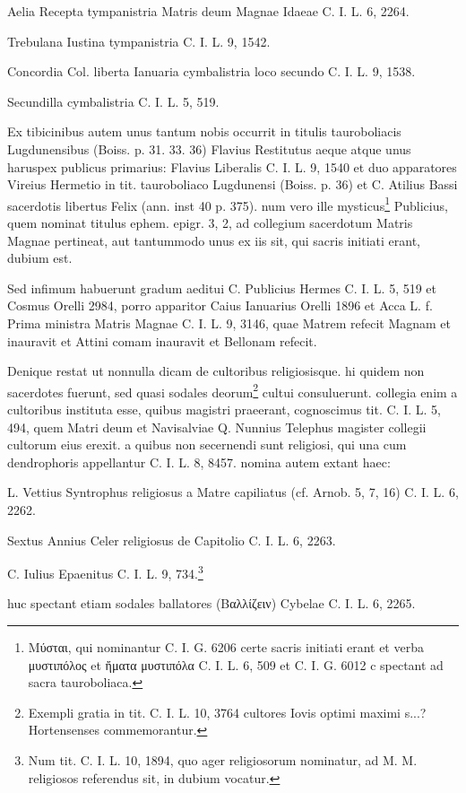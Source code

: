 \documentclass[a4paper, 11pt, oneside, polutonikogreek, german, twocolumn]{article}
\begin{document}
Aelia Recepta tympanistria Matris deum Magnae Idaeae C. I. L. 6, 2264.

Trebulana Iustina tympanistria C. I. L. 9, 1542.

Concordia Col. liberta Ianuaria cymbalistria loco secundo C. I. L. 9, 1538.

Secundilla cymbalistria C. I. L. 5, 519.

Ex tibicinibus autem unus tantum nobis occurrit in titulis tauroboliacis Lugdunensibus (Boiss. p. 31. 33. 36) Flavius Restitutus aeque atque unus haruspex publicus primarius: Flavius Liberalis C. I. L. 9, 1540 et duo apparatores Vireius Hermetio in tit. tauroboliaco Lugdunensi (Boiss. p. 36) et C. Atilius Bassi sacerdotis libertus Felix (ann. inst 40 p. 375). num vero ille mysticus\footnote{Μύσται, qui nominantur C. I. G. 6206 certe sacris initiati erant et verba μυστιπόλος et ἤματα μυστιπόλα C. I. L. 6, 509 et C. I. G. 6012 c spectant ad sacra tauroboliaca.} Publicius, quem nominat titulus ephem. epigr. 3, 2, ad collegium sacerdotum Matris Magnae pertineat, aut tantummodo unus ex iis sit, qui sacris initiati erant, dubium est.

Sed infimum habuerunt gradum aeditui C. Publicius Hermes C. I. L. 5, 519 et Cosmus Orelli 2984, porro apparitor Caius Ianuarius Orelli 1896 et Acca L. f. Prima ministra Matris Magnae C. I. L. 9, 3146, quae Matrem refecit Magnam et inauravit et Attini comam inauravit et Bellonam refecit.

Denique restat ut nonnulla dicam de cultoribus religiosisque. hi quidem non sacerdotes fuerunt, sed quasi sodales deorum\footnote{Exempli gratia in tit. C. I. L. 10, 3764 cultores Iovis optimi maximi s...? Hortensenses commemorantur.} cultui consuluerunt. collegia enim a cultoribus instituta esse, quibus magistri praeerant, cognoscimus tit. C. I. L. 5, 494, quem Matri deum et Navisalviae Q. Nunnius Telephus magister collegii cultorum eius erexit. a quibus non secernendi sunt religiosi, qui una cum dendrophoris appellantur C. I. L. 8, 8457. nomina autem extant haec:

L. Vettius Syntrophus religiosus a Matre capiliatus (cf. Arnob. 5, 7, 16) C. I. L. 6, 2262.

Sextus Annius Celer religiosus de Capitolio C. I. L. 6, 2263.

C. Iulius Epaenitus C. I. L. 9, 734.\footnote{Num tit. C. I. L. 10, 1894, quo ager religiosorum nominatur, ad M. M. religiosos referendus sit, in dubium vocatur.}

huc spectant etiam sodales ballatores (Βαλλίζειν) Cybelae C. I. L. 6, 2265.
\end{document}
